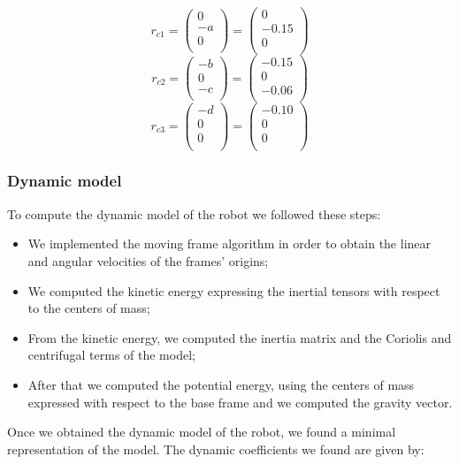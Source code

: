 \documentclass{article}
\begin{document}
\[r_{c1}=\begin{pmatrix}
0\\
-a\\
0\\
\end{pmatrix} = \begin{pmatrix}
0\\
-0.15\\
0\\
\end{pmatrix}
\]
\[r_{c2}=\begin{pmatrix}
-b\\
0\\
-c\\
\end{pmatrix} = \begin{pmatrix}
-0.15\\
0\\
-0.06\\
\end{pmatrix}
\]
\[r_{c3}=\begin{pmatrix}
-d\\
0\\
0\\
\end{pmatrix} = \begin{pmatrix}
-0.10\\
0\\
0\\
\end{pmatrix}
\]
\subsubsection*{Dynamic model}
To compute the dynamic model of the robot we followed these steps:
\begin{itemize}
\item We implemented the moving frame algorithm in order to obtain the linear and angular velocities of the frames' origins;
\item We computed the kinetic energy expressing the inertial tensors with respect to the centers of mass;
\item From the kinetic energy, we computed the inertia matrix and the Coriolis and centrifugal terms of the model;
\item After that we computed the potential energy, using the centers of mass expressed with respect to the base frame and we computed the gravity vector.
\end{itemize}
Once we obtained the dynamic model of the robot, we found a minimal representation of the model. The dynamic coefficients we found are given by:
\end{document}
